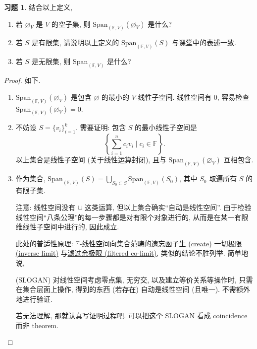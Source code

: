 \documentclass[11pt]{ctexart}
\theoremstyle{definition}
\numberwithin{equation}{section}
\theoremstyle{definition}
\newtheorem*{exercise}{习题}
\theoremstyle{remark}
\begin{document}
\begin{exercise}
    结合以上定义, 
    \begin{enumerate}
        \item 若 $\varnothing_V$ 是 $V$ 的空子集, 则 $\mathrm{Span}_{(\mathbb F,V)}(\varnothing_V)$ 是什么? 
        \item 若 $S$ 是有限集, 请说明以上定义的 $\mathrm{Span}_{(\mathbb F,V)}(S)$ 与课堂中的表述一致. 
        \item 若 $S$ 是无限集, 则 $\mathrm{Span}_{(\mathbb F,V)}$ 是什么? 
    \end{enumerate}
    \begin{proof}
        如下. 
        \begin{enumerate}
            \item $\mathrm{Span}_{(\mathbb F,V)}(\varnothing_V)$ 是包含 $\varnothing$ 的最小的 $V$-线性子空间. 线性空间有 $0$, 容易检查 $\mathrm{Span}_{(\mathbb F,V)}(\varnothing_V)=0$. 
            \item 不妨设 $S=\{v_i\}_{i=1}^k$. 需要证明: 包含 $S$ 的最小线性子空间是
            \begin{equation}
                \left\{\sum_{i=1}^n c_i v_i\mid c_i\in \mathbb F\right\}.
            \end{equation}
            以上集合是线性子空间 (关于线性运算封闭), 且与 $\mathrm{Span}_{(\mathbb F,V)}(\varnothing _V)$ 互相包含. 
            \item 作为集合, $\mathrm{Span}_{(\mathbb F,V)}(S)=\bigcup_{S_0\subset S}\mathrm{Span}_{(\mathbb F,V)}(S_0)$, 其中 $S_0$ 取遍所有 $S$ 的有限子集. 
            \begin{pinked}
                注意: 线性空间没有 $\cup$ 这类运算, 但以上集合确实``自动是线性空间''. 由于检验线性空间``八条公理''的每一步骤都是对有限个对象进行的, 从而是在某一有限维线性子空间中进行的, 因此成立. 
            \end{pinked}
            此处的普适性原理: $\mathbb F$-线性空间向集合范畴的遗忘函子\href{https://ncatlab.org/nlab/show/created+limit}{生 (create)} 一切\href{https://ncatlab.org/nlab/show/inverse+limit}{极限 (inverse limit)} 与\href{https://ncatlab.org/nlab/show/filtered+colimit}{滤过余极限 (filtered co-limit)}, 类似的结论不胜列举. 简单地说, 
            \begin{pinked}
                (SLOGAN) 对线性空间考虑零点集, 无穷交, 以及建立等价关系等操作时, 只需在集合层面上操作, 得到的东西 (若存在) 自动是线性空间 (且唯一). 不需额外地进行验证.  
            \end{pinked}
            若无法理解, 那就认真写证明过程吧. 可以把这个 SLOGAN 看成 coincidence 而非 theorem. 
        \end{enumerate}
    \end{proof}
\end{exercise}
\end{document}
